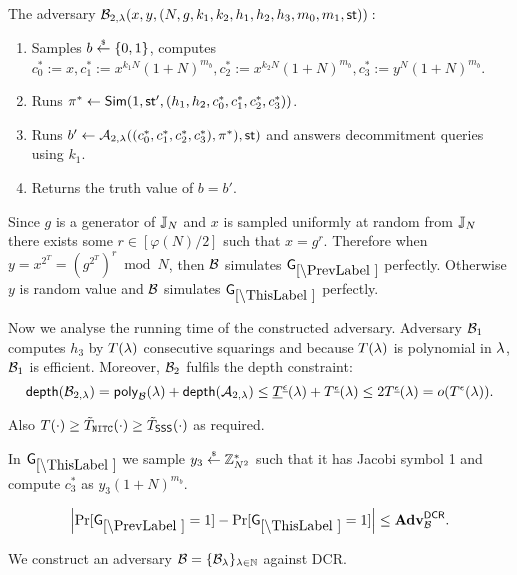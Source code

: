 The adversary $\mathcal{B}_{2,\lambda}(x,y,(N,g,k_1, k_2, h_1,h_2,h_3, m_0, m_1, \mathsf{st})):$
\vspace{-2mm}
\begin{enumerate}
\item Samples $b \stackrel{{\scriptscriptstyle\$}}{\leftarrow} \{0,1\}$, computes $c_0^*:=x, c_1^*:=x^{k_1N}(1+N)^{m_b}, c_2^*:=x^{k_2N}(1+N)^{m_b}, c_3^*:=y^{N}(1+N)^{m_b}$.
\item Runs $\pi^* \leftarrow \mathsf{Sim}(1, \mathsf{st}', (h_1, h_2, c_0^*, c_1^*, c_2^*, c_3^*))$.
\item Runs $b' \leftarrow \mathcal{A}_{2, \lambda}((c_0^*, c_1^*, c_2^*, c_3^*), \pi^*), \mathsf{st})$ and answers decommitment queries using $k_1$.
\item Returns the truth value of $b=b'$.
\end{enumerate}
Since $g$ is a generator of $\mathbb{J}_N$ and $x$ is sampled uniformly at random from $\mathbb{J}_N$ there exists some $r \in [\varphi(N)/2]$ such that $x = g^{r}$. Therefore when $y = x^{2^T} = (g^{2^T})^{r} \bmod N$, then $\mathcal{B}$ simulates $\games_\prevgame$ perfectly. Otherwise $y$ is random value and $\mathcal{B}$ simulates $\games_\thisgame$ perfectly. 

Now we analyse the running time of the constructed adversary. Adversary $\mathcal{B}_1$ computes $h_3$ by $T(\lambda)$ consecutive squarings and because $T(\lambda)$ is polynomial in $\lambda$, $\mathcal{B}_1$ is efficient. Moreover, $\mathcal{B}_2$ fulfils the depth constraint:
\[ \mathsf{depth}(\mathcal{B}_{2,\lambda}) = \mathsf{poly}_{\mathcal{B}}(\lambda) + \mathsf{depth}(\mathcal{A}_{2,\lambda}) \leq \underline{T}^{\underline{\epsilon}}(\lambda) + T^{\underline{\epsilon}}(\lambda) \leq 2 T^{\underline{\epsilon}}(\lambda) = o(T^{\epsilon}(\lambda)). \] 

Also $T(\cdot) \geq \tilde{T}_{\mathtt{NITC}}(\cdot) \geq \tilde{T}_\mathsf{SSS}(\cdot)$ as required.

%




In $\games_\thisgame$ we sample $y_3 \stackrel{{\scriptscriptstyle\$}}{\leftarrow} \mathbb{Z}_{N^2}^*$ such that it has Jacobi symbol 1 and compute $c_3^*$ as $y_3(1+N)^{m_b}$. 

\begin{lemma}\label{lem:dcr-rom-lh}
\[
\left|\Pr[\games_\prevgame = 1] - \Pr[\games_\thisgame = 1]\right| \leq \advtg_\advB^\dcr.
\]
\end{lemma}
We construct an adversary $\mathcal{B} = \{\mathcal{B}_{\lambda}\}_{\lambda \in \mathbb{N}}$ against DCR.

